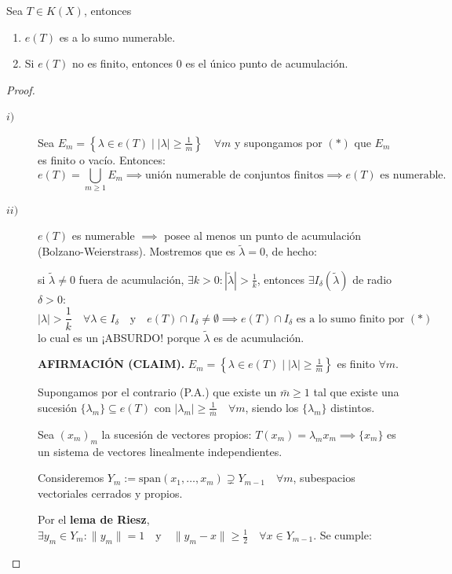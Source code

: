 \begin{teo}
    Sea $T \in K(X)$, entonces
    \begin{enumerate}
        \item[i)] $e(T)$ es a lo sumo numerable.
        \item[ii)] Si $e(T)$ no es finito, entonces $0$ es el único punto de acumulación.
    \end{enumerate}
\begin{proof}   %
    \begin{description}
        \item[$i)$] Sea $E_m = \left\{ \lambda \in e(T) \mid |\lambda| \geq \frac{1}{m} \right\} \quad \forall m$ y supongamos por $(*)$ que $E_m$ es finito o vacío. Entonces:
        \[ e(T) = \bigcup_{m \geq 1} E_m \implies \text{unión numerable de conjuntos finitos} \implies e(T) \text{ es numerable}. \]

        \item[$ii)$] $e(T)$ es numerable $\implies$ posee al menos un punto de acumulación (Bolzano-Weierstrass). Mostremos que es $\tilde{\lambda} = 0$, de hecho:

        \noindent si $\tilde{\lambda} \neq 0$ fuera de acumulación, $\exists k > 0 : |\tilde{\lambda}| > \frac{1}{k}$, entonces $\exists I_\delta(\tilde{\lambda})$ de radio $\delta > 0 :$
        \[ |\lambda| > \frac{1}{k} \quad \forall \lambda \in I_\delta \quad \text{y} \quad e(T) \cap I_\delta \neq \emptyset \implies e(T) \cap I_\delta \text{ es a lo sumo finito por } (*) \]
        lo cual es un ¡ABSURDO! porque $\tilde{\lambda}$ es de acumulación.

        \noindent \textbf{AFIRMACIÓN (CLAIM).} $E_m = \left\{ \lambda \in e(T) \mid |\lambda| \geq \frac{1}{m} \right\}$ es finito $\forall m$.

        \noindent Supongamos por el contrario (P.A.) que existe un $\bar{m} \geq 1$ tal que existe una sucesión $\{\lambda_m\} \subseteq e(T)$ con $|\lambda_m| \geq \frac{1}{\bar{m}} \quad \forall m$, siendo los $\{\lambda_m\}$ distintos.

        \noindent Sea $(x_m)_m$ la sucesión de vectores propios: $T(x_m) = \lambda_m x_m \implies \{x_m\}$ es un sistema de vectores linealmente independientes.

        \noindent Consideremos $Y_m := \text{span}(x_1, \dots, x_m) \supsetneq Y_{m-1} \quad \forall m$, subespacios vectoriales cerrados y propios.

        \noindent Por el \textbf{lema de Riesz}, $\exists y_m \in Y_m : \|y_m\| = 1 \quad \text{y} \quad \|y_m - x\| \geq \frac{1}{2} \quad \forall x \in Y_{m-1}$. Se cumple:


\end{description}
\end{proof}
\end{teo}
